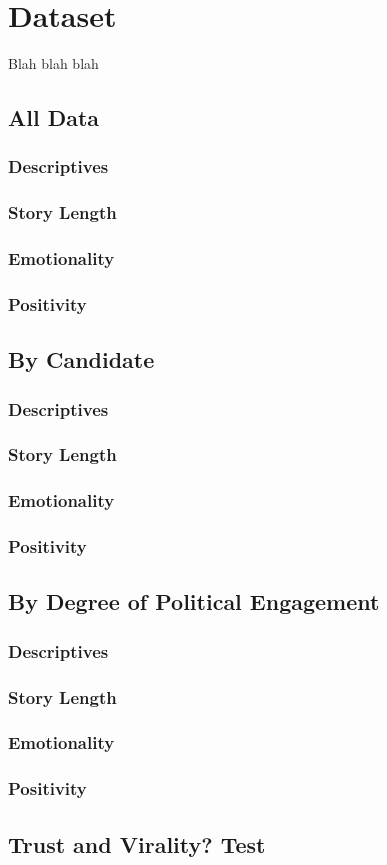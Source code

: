  \chapter{Dataset}
 Blah blah blah

 \section{All Data}
 \subsection{Descriptives}
 \subsection{Story Length}
 \subsection{Emotionality}
 \subsection{Positivity}

  \section{By Candidate}
 \subsection{Descriptives}
 \subsection{Story Length}
 \subsection{Emotionality}
 \subsection{Positivity}


  \section{By Degree of Political Engagement}
 \subsection{Descriptives}
 \subsection{Story Length}
 \subsection{Emotionality}
 \subsection{Positivity}

 \section{Trust and Virality? Test}